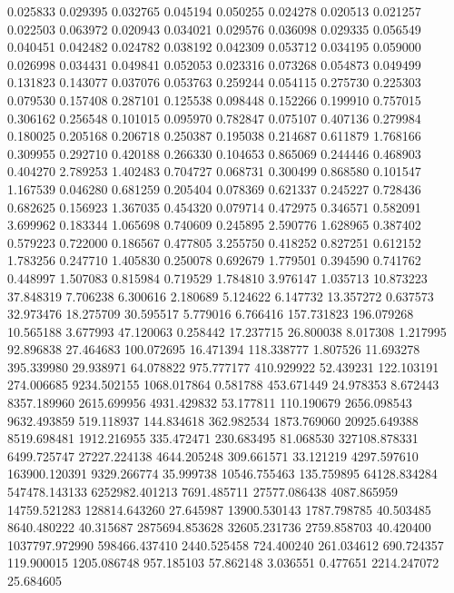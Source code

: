 0.025833
0.029395
0.032765
0.045194
0.050255
0.024278
0.020513
0.021257
0.022503
0.063972
0.020943
0.034021
0.029576
0.036098
0.029335
0.056549
0.040451
0.042482
0.024782
0.038192
0.042309
0.053712
0.034195
0.059000
0.026998
0.034431
0.049841
0.052053
0.023316
0.073268
0.054873
0.049499
0.131823
0.143077
0.037076
0.053763
0.259244
0.054115
0.275730
0.225303
0.079530
0.157408
0.287101
0.125538
0.098448
0.152266
0.199910
0.757015
0.306162
0.256548
0.101015
0.095970
0.782847
0.075107
0.407136
0.279984
0.180025
0.205168
0.206718
0.250387
0.195038
0.214687
0.611879
1.768166
0.309955
0.292710
0.420188
0.266330
0.104653
0.865069
0.244446
0.468903
0.404270
2.789253
1.402483
0.704727
0.068731
0.300499
0.868580
0.101547
1.167539
0.046280
0.681259
0.205404
0.078369
0.621337
0.245227
0.728436
0.682625
0.156923
1.367035
0.454320
0.079714
0.472975
0.346571
0.582091
3.699962
0.183344
1.065698
0.740609
0.245895
2.590776
1.628965
0.387402
0.579223
0.722000
0.186567
0.477805
3.255750
0.418252
0.827251
0.612152
1.783256
0.247710
1.405830
0.250078
0.692679
1.779501
0.394590
0.741762
0.448997
1.507083
0.815984
0.719529
1.784810
3.976147
1.035713
10.873223
37.848319
7.706238
6.300616
2.180689
5.124622
6.147732
13.357272
0.637573
32.973476
18.275709
30.595517
5.779016
6.766416
157.731823
196.079268
10.565188
3.677993
47.120063
0.258442
17.237715
26.800038
8.017308
1.217995
92.896838
27.464683
100.072695
16.471394
118.338777
1.807526
11.693278
395.339980
29.938971
64.078822
975.777177
410.929922
52.439231
122.103191
274.006685
9234.502155
1068.017864
0.581788
453.671449
24.978353
8.672443
8357.189960
2615.699956
4931.429832
53.177811
110.190679
2656.098543
9632.493859
519.118937
144.834618
362.982534
1873.769060
20925.649388
8519.698481
1912.216955
335.472471
230.683495
81.068530
327108.878331
6499.725747
27227.224138
4644.205248
309.661571
33.121219
4297.597610
163900.120391
9329.266774
35.999738
10546.755463
135.759895
64128.834284
547478.143133
6252982.401213
7691.485711
27577.086438
4087.865959
14759.521283
128814.643260
27.645987
13900.530143
1787.798785
40.503485
8640.480222
40.315687
2875694.853628
32605.231736
2759.858703
40.420400
1037797.972990
598466.437410
2440.525458
724.400240
261.034612
690.724357
119.900015
1205.086748
957.185103
57.862148
3.036551
0.477651
2214.247072
25.684605
